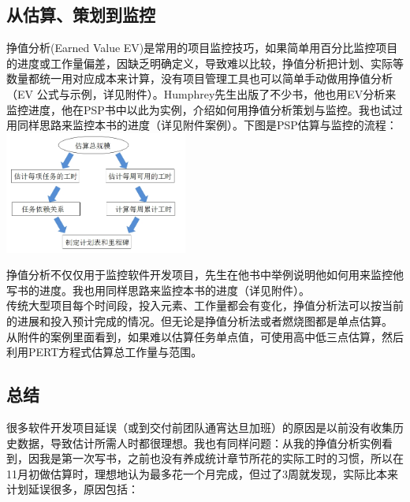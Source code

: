 \hypertarget{ux4eceux4f30ux7b97ux7b56ux5212ux5230ux76d1ux63a7}{%
\subsection{从估算、策划到监控}\label{ux4eceux4f30ux7b97ux7b56ux5212ux5230ux76d1ux63a7}}

挣值分析(Earned Value EV)是常用的项目监控技巧，如果简单用百分比监控项目的进度或工作量偏差，因缺乏明确定义，导致难以比较，挣值分析把计划、实际等数量都统一用对应成本来计算，没有项目管理工具也可以简单手动做用挣值分析（EV 公式与示例，详见附件）。Humphrey先生出版了不少书，他也用EV分析来监控进度，他在PSP书中以此为实例，介绍如何用挣值分析策划与监控。我也试过用同样思路来监控本书的进度（详见附件案例）。下图是PSP估算与监控的流程：\\


\includegraphics[width=6cm]{PSP_fig72-1.jpg}

挣值分析不仅仅用于监控软件开发项目，先生在他书中举例说明他如何用来监控他写书的进度。我也用同样思路来监控本书的进度（详见附件）。\\
传统大型项目每个时间段，投入元素、工作量都会有变化，挣值分析法可以按当前的进展和投入预计完成的情况。但无论是挣值分析法或者燃烧图都是单点估算。\\
从附件的案例里面看到，如果难以估算任务单点值，可使用高中低三点估算，然后利用PERT方程式估算总工作量与范围。\\

\hypertarget{ux603bux7ed3}{%
\subsection{总结}\label{ux603bux7ed3}}

很多软件开发项目延误（或到交付前团队通宵达旦加班）的原因是以前没有收集历史数据，导致估计所需人时都很理想。我也有同样问题：从我的挣值分析实例看到，因我是第一次写书，之前也没有养成统计章节所花的实际工时的习惯，所以在11月初做估算时，理想地认为最多花一个月完成，但过了3周就发现，实际比本来计划延误很多，原因包括：\\

